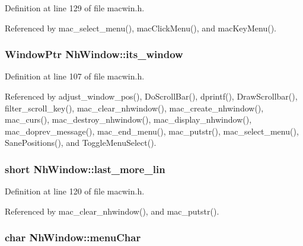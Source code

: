 Definition at line 129 of file macwin.\+h.



Referenced by mac\+\_\+select\+\_\+menu(), mac\+Click\+Menu(), and mac\+Key\+Menu().

\hypertarget{structNhWindow_a68dc7295b79e14f4a78a0040c15888e5}{
\subsubsection[{its\+\_\+window}]{\setlength{\rightskip}{0pt plus 5cm}Window\+Ptr Nh\+Window\+::its\+\_\+window}}\label{structNhWindow_a68dc7295b79e14f4a78a0040c15888e5}


Definition at line 107 of file macwin.\+h.



Referenced by adjust\+\_\+window\+\_\+pos(), Do\+Scroll\+Bar(), dprintf(), Draw\+Scrollbar(), filter\+\_\+scroll\+\_\+key(), mac\+\_\+clear\+\_\+nhwindow(), mac\+\_\+create\+\_\+nhwindow(), mac\+\_\+curs(), mac\+\_\+destroy\+\_\+nhwindow(), mac\+\_\+display\+\_\+nhwindow(), mac\+\_\+doprev\+\_\+message(), mac\+\_\+end\+\_\+menu(), mac\+\_\+putstr(), mac\+\_\+select\+\_\+menu(), Sane\+Positions(), and Toggle\+Menu\+Select().

\hypertarget{structNhWindow_a0645528f32a19a8be138755283ffe5fe}{
\subsubsection[{last\+\_\+more\+\_\+lin}]{\setlength{\rightskip}{0pt plus 5cm}short Nh\+Window\+::last\+\_\+more\+\_\+lin}}\label{structNhWindow_a0645528f32a19a8be138755283ffe5fe}


Definition at line 120 of file macwin.\+h.



Referenced by mac\+\_\+clear\+\_\+nhwindow(), and mac\+\_\+putstr().

\hypertarget{structNhWindow_a8b268c04721668c1c60bc2bcf8e2c617}{
\subsubsection[{menu\+Char}]{\setlength{\rightskip}{0pt plus 5cm}char Nh\+Window\+::menu\+Char}}\label{structNhWindow_a8b268c04721668c1c60bc2bcf8e2c617}


